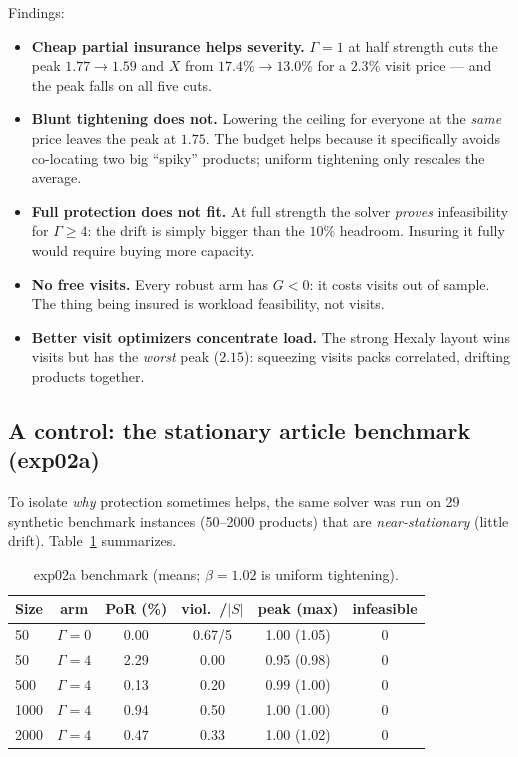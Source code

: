 \documentclass[11pt]{article}
\theoremstyle{definition}
\theoremstyle{plain}
\theoremstyle{remark}
\begin{document}
Findings:
\begin{itemize}[nosep]
  \item \textbf{Cheap partial insurance helps severity.} $\Gamma=1$ at half
  strength cuts the peak $1.77\to1.59$ and $X$ from $17.4\%\to13.0\%$ for a
  $2.3\%$ visit price --- and the peak falls on all five cuts.
  \item \textbf{Blunt tightening does not.} Lowering the ceiling for everyone at
  the \emph{same} price leaves the peak at $1.75$. The budget helps because it
  specifically avoids co-locating two big ``spiky'' products; uniform tightening
  only rescales the average.
  \item \textbf{Full protection does not fit.} At full strength the solver
  \emph{proves} infeasibility for $\Gamma\ge4$: the drift is simply bigger than
  the $10\%$ headroom. Insuring it fully would require buying more capacity.
  \item \textbf{No free visits.} Every robust arm has $G<0$: it costs visits out
  of sample. The thing being insured is workload feasibility, not visits.
  \item \textbf{Better visit optimizers concentrate load.} The strong Hexaly
  layout wins visits but has the \emph{worst} peak ($2.15$): squeezing visits
  packs correlated, drifting products together.
\end{itemize}

\subsection{A control: the stationary article benchmark (exp02a)}

To isolate \emph{why} protection sometimes helps, the same solver was run on 29
synthetic benchmark instances (50--2000 products) that are \emph{near-stationary}
(little drift). Table~\ref{tab:exp02a} summarizes.

\begin{table}[h]\centering
\caption{exp02a benchmark (means; $\beta=1.02$ is uniform tightening).}
\label{tab:exp02a}
\begin{tabular}{lccccc}
\toprule
Size & arm & PoR (\%) & viol.\ /$|S|$ & peak (max) & infeasible \\
\midrule
50   & $\Gamma=0$ & 0.00 & 0.67/5  & 1.00 (1.05) & 0 \\
50   & $\Gamma=4$ & 2.29 & 0.00    & 0.95 (0.98) & 0 \\
500  & $\Gamma=4$ & 0.13 & 0.20    & 0.99 (1.00) & 0 \\
1000 & $\Gamma=4$ & 0.94 & 0.50    & 1.00 (1.00) & 0 \\
2000 & $\Gamma=4$ & 0.47 & 0.33    & 1.00 (1.02) & 0 \\
\bottomrule
\end{tabular}
\end{table}
\end{document}
